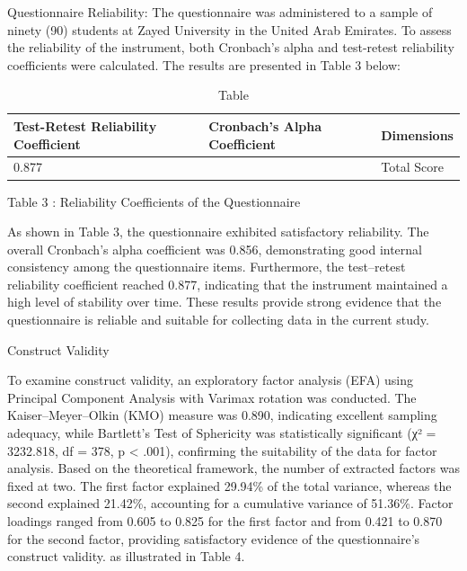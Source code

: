 \documentclass[10pt]{NSP1}
\begin{document}
Questionnaire Reliability: The questionnaire was administered to a sample of ninety (90) students at Zayed University in the United Arab Emirates. To assess the reliability of the instrument, both Cronbach's alpha and test-retest reliability coefficients were calculated. The results are presented in Table 3 below:

\begin{table}[tbp]
\centering
{\renewcommand{\arraystretch}{1.54}\small
\begin{tabular}{|>{\centering\arraybackslash}p{}|>{\centering\arraybackslash}p{}|>{\centering\arraybackslash}p{}|}
\hline
\cellcolor[HTML]{DDD9C3}\textbf{Test-Retest Reliability Coefficient} & \cellcolor[HTML]{DDD9C3}\textbf{Cronbach's Alpha Coefficient} & \cellcolor[HTML]{DDD9C3}\textbf{Dimensions} \\
\hline
\cellcolor[HTML]{DDD9C3}0.877 & 0.856 & Total Score \\
\hline
\end{tabular}}
\caption{Table}

\end{table}

Table 3 : Reliability Coefficients of the Questionnaire

As shown in Table 3, the questionnaire exhibited satisfactory reliability. The overall Cronbach's alpha coefficient was 0.856, demonstrating good internal consistency among the questionnaire items. Furthermore, the test–retest reliability coefficient reached 0.877, indicating that the instrument maintained a high level of stability over time. These results provide strong evidence that the questionnaire is reliable and suitable for collecting data in the current study.

Construct Validity

To examine construct validity, an exploratory factor analysis (EFA) using Principal Component Analysis with Varimax rotation was conducted. The Kaiser–Meyer–Olkin (KMO) measure was 0.890, indicating excellent sampling adequacy, while Bartlett's Test of Sphericity was statistically significant (χ² = 3232.818, df = 378, p \textless{} .001), confirming the suitability of the data for factor analysis. Based on the theoretical framework, the number of extracted factors was fixed at two. The first factor explained 29.94\% of the total variance, whereas the second explained 21.42\%, accounting for a cumulative variance of 51.36\%. Factor loadings ranged from 0.605 to 0.825 for the first factor and from 0.421 to 0.870 for the second factor, providing satisfactory evidence of the questionnaire's construct validity. as illustrated in Table 4.
\end{document}
